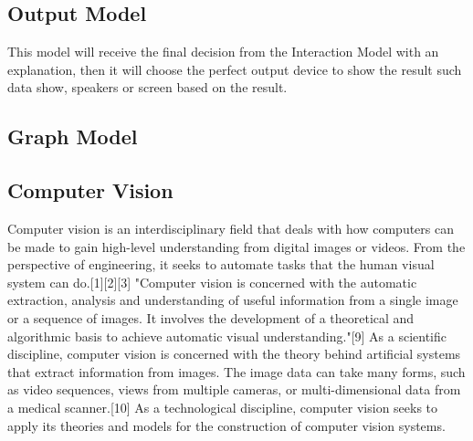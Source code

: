 \documentclass[12pt,a4paper]{article}
\begin{document}
\subsection{Output Model}
\par This model will receive the final decision from the
Interaction Model with an explanation, then it will choose the
perfect output device to show the result such data show,
speakers or screen based on the result.

\newpage
\begin{center}
\section{Graph Model}
\end{center}

\subsection{Computer Vision}
\par Computer vision is an interdisciplinary field that deals with how computers can be made to gain high-level understanding from digital images or videos. From the perspective of engineering, it seeks to automate tasks that the human visual system can do.[1][2][3] "Computer vision is concerned with the automatic extraction, analysis and understanding of useful information from a single image or a sequence of images. It involves the development of a theoretical and algorithmic basis to achieve automatic visual understanding."[9] As a scientific discipline, computer vision is concerned with the theory behind artificial systems that extract information from images. The image data can take many forms, such as video sequences, views from multiple cameras, or multi-dimensional data from a medical scanner.[10] As a technological discipline, computer vision seeks to apply its theories and models for the construction of computer vision systems. 
\par
\end{document}
